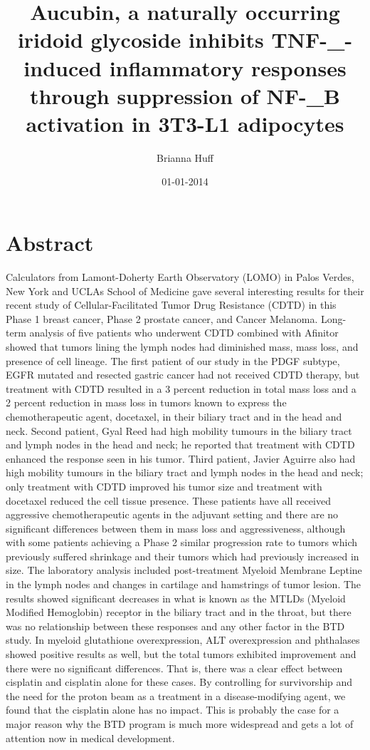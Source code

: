 \documentclass{article}%
\title{Aucubin, a naturally occurring iridoid glycoside inhibits TNF{-}\_{-}induced inflammatory responses through suppression of NF{-}\_B activation in 3T3{-}L1 adipocytes}%
\author{Brianna Huff}%
\affil{School of Dentistry, Chung Shan Medical University, Taichung 40201, Taiwan}%
\date{01{-}01{-}2014}%
\begin{document}
%
\normalsize%
\maketitle%
\section{Abstract}%
\label{sec:Abstract}%
Calculators from Lamont{-}Doherty Earth Observatory (LOMO) in Palos Verdes, New York and UCLAs School of Medicine gave several interesting results for their recent study of Cellular{-}Facilitated Tumor Drug Resistance (CDTD) in this Phase 1 breast cancer, Phase 2 prostate cancer, and Cancer Melanoma.\newline%
Long{-}term analysis of five patients who underwent CDTD combined with Afinitor showed that tumors lining the lymph nodes had diminished mass, mass loss, and presence of cell lineage. The first patient of our study in the PDGF subtype, EGFR mutated and resected gastric cancer had not received CDTD therapy, but treatment with CDTD resulted in a 3 percent reduction in total mass loss and a 2 percent reduction in mass loss in tumors known to express the chemotherapeutic agent, docetaxel, in their biliary tract and in the head and neck. Second patient, Gyal Reed had high mobility tumours in the biliary tract and lymph nodes in the head and neck; he reported that treatment with CDTD enhanced the response seen in his tumor. Third patient, Javier Aguirre also had high mobility tumours in the biliary tract and lymph nodes in the head and neck; only treatment with CDTD improved his tumor size and treatment with docetaxel reduced the cell tissue presence. These patients have all received aggressive chemotherapeutic agents in the adjuvant setting and there are no significant differences between them in mass loss and aggressiveness, although with some patients achieving a Phase 2 similar progression rate to tumors which previously suffered shrinkage and their tumors which had previously increased in size.\newline%
The laboratory analysis included post{-}treatment Myeloid Membrane Leptine in the lymph nodes and changes in cartilage and hamstrings of tumor lesion. The results showed significant decreases in what is known as the MTLDs (Myeloid Modified Hemoglobin) receptor in the biliary tract and in the throat, but there was no relationship between these responses and any other factor in the BTD study.\newline%
In myeloid glutathione overexpression, ALT overexpression and phthalases showed positive results as well, but the total tumors exhibited improvement and there were no significant differences. That is, there was a clear effect between cisplatin and cisplatin alone for these cases. By controlling for survivorship and the need for the proton beam as a treatment in a disease{-}modifying agent, we found that the cisplatin alone has no impact. This is probably the case for a major reason why the BTD program is much more widespread and gets a lot of attention now in medical development.\newline%
\end{document}
